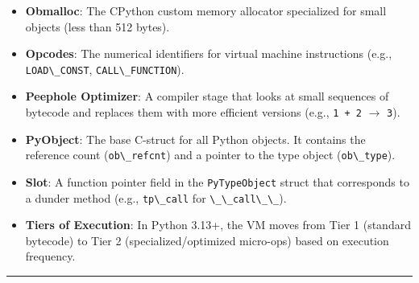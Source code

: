 \begin{itemize}
  the C3 linearization algorithm.
\item
  \textbf{Obmalloc}: The CPython custom memory allocator specialized for
  small objects (less than 512 bytes).
\item
  \textbf{Opcodes}: The numerical identifiers for virtual machine
  instructions (e.g., \passthrough{\lstinline!LOAD\_CONST!},
  \passthrough{\lstinline!CALL\_FUNCTION!}).
\item
  \textbf{Peephole Optimizer}: A compiler stage that looks at small
  sequences of bytecode and replaces them with more efficient versions
  (e.g., \passthrough{\lstinline!1 + 2!} \(\rightarrow\)
  \passthrough{\lstinline!3!}).
\item
  \textbf{PyObject}: The base C-struct for all Python objects. It
  contains the reference count (\passthrough{\lstinline!ob\_refcnt!})
  and a pointer to the type object (\passthrough{\lstinline!ob\_type!}).
\item
  \textbf{Slot}: A function pointer field in the
  \passthrough{\lstinline!PyTypeObject!} struct that corresponds to a
  dunder method (e.g., \passthrough{\lstinline!tp\_call!} for
  \passthrough{\lstinline!\_\_call\_\_!}).
\item
  \textbf{Tiers of Execution}: In Python 3.13+, the VM moves from Tier 1
  (standard bytecode) to Tier 2 (specialized/optimized micro-ops) based
  on execution frequency.
\end{itemize}

\begin{center}\rule{0.5\linewidth}{0.5pt}\end{center}
